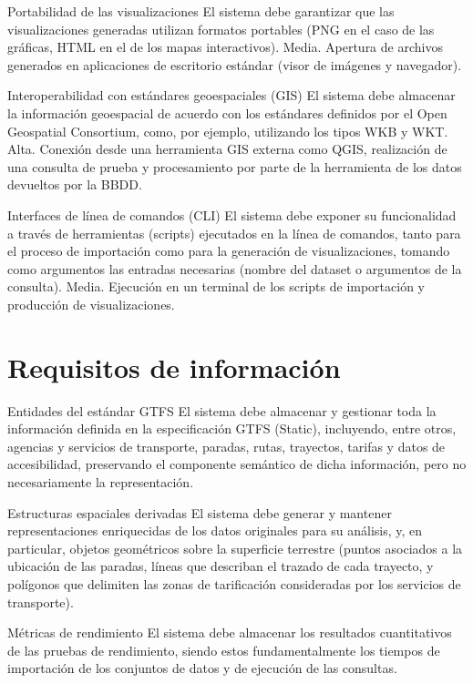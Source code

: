 \nfreq
    {Portabilidad de las visualizaciones}
    {El sistema debe garantizar que las visualizaciones generadas utilizan formatos portables (PNG en el caso de las gráficas, HTML en el de los mapas interactivos).}
    {Media.}
    {Apertura de archivos generados en aplicaciones de escritorio estándar (visor de imágenes y navegador).}

\nfreq
    {Interoperabilidad con estándares geoespaciales (GIS)}
    {El sistema debe almacenar la información geoespacial de acuerdo con los estándares definidos por el Open Geospatial Consortium, como, por ejemplo, utilizando los tipos WKB y WKT.}
    {Alta.}
    {Conexión desde una herramienta GIS externa como QGIS, realización de una consulta de prueba y procesamiento por parte de la herramienta de los datos devueltos por la BBDD.}

\nfreq
    {Interfaces de línea de comandos (CLI)}
    {El sistema debe exponer su funcionalidad a través de herramientas (scripts) ejecutados en la línea de comandos, tanto para el proceso de importación como para la generación de visualizaciones, tomando como argumentos las entradas necesarias (nombre del dataset o argumentos de la consulta).}
    {Media.}
    {Ejecución en un terminal de los scripts de importación y producción de visualizaciones.}

\section{Requisitos de información}

\ireq
    {Entidades del estándar GTFS}
    {El sistema debe almacenar y gestionar toda la información definida en la especificación GTFS (Static), incluyendo, entre otros, agencias y servicios de transporte, paradas, rutas, trayectos, tarifas y datos de accesibilidad, preservando el componente semántico de dicha información, pero no necesariamente la representación.}

\ireq
    {Estructuras espaciales derivadas}
    {El sistema debe generar y mantener representaciones enriquecidas de los datos originales para su análisis, y, en particular, objetos geométricos sobre la superficie terrestre (puntos asociados a la ubicación de las paradas, líneas que describan el trazado de cada trayecto, y polígonos que delimiten las zonas de tarificación consideradas por los servicios de transporte).}

\ireq
    {Métricas de rendimiento}
    {El sistema debe almacenar los resultados cuantitativos de las pruebas de rendimiento, siendo estos fundamentalmente los tiempos de importación de los conjuntos de datos y de ejecución de las consultas.}
